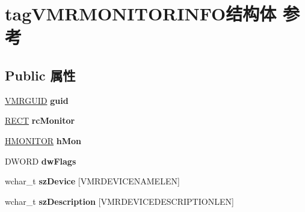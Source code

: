 \hypertarget{structtag_v_m_r_m_o_n_i_t_o_r_i_n_f_o}{}\section{tag\+V\+M\+R\+M\+O\+N\+I\+T\+O\+R\+I\+N\+F\+O结构体 参考}
\label{structtag_v_m_r_m_o_n_i_t_o_r_i_n_f_o}
\subsection*{Public 属性}
\begin{DoxyCompactItemize}
\item 
\mbox{\label{structtag_v_m_r_m_o_n_i_t_o_r_i_n_f_o_a5a3d93076c6969efb35dd047f0caa55b}} 
\hyperlink{structtag_v_m_r_g_u_i_d}{V\+M\+R\+G\+U\+ID} {\bfseries guid}
\item 
\mbox{\label{structtag_v_m_r_m_o_n_i_t_o_r_i_n_f_o_a97d40d63b150299f76507b3288fbbc51}} 
\hyperlink{structtag_r_e_c_t}{R\+E\+CT} {\bfseries rc\+Monitor}
\item 
\mbox{\label{structtag_v_m_r_m_o_n_i_t_o_r_i_n_f_o_aabe2951b924a80f1279dccd910df0f47}} 
\hyperlink{interfacevoid}{H\+M\+O\+N\+I\+T\+OR} {\bfseries h\+Mon}
\item 
\mbox{\label{structtag_v_m_r_m_o_n_i_t_o_r_i_n_f_o_a5336dcade6c6f9d66a127bed2a6140d7}} 
D\+W\+O\+RD {\bfseries dw\+Flags}
\item 
\mbox{\label{structtag_v_m_r_m_o_n_i_t_o_r_i_n_f_o_ae5c215e24ea7c325a4a8a8ac96dd25ea}} 
wchar\+\_\+t {\bfseries sz\+Device} \mbox{[}V\+M\+R\+D\+E\+V\+I\+C\+E\+N\+A\+M\+E\+L\+EN\mbox{]}
\item 
\mbox{\label{structtag_v_m_r_m_o_n_i_t_o_r_i_n_f_o_ab7e76eda1c55429c3d23b87894044f2c}} 
wchar\+\_\+t {\bfseries sz\+Description} \mbox{[}V\+M\+R\+D\+E\+V\+I\+C\+E\+D\+E\+S\+C\+R\+I\+P\+T\+I\+O\+N\+L\+EN\mbox{]}
\item 
\mbox{\label{structtag_v_m_r_m_o_n_i_t_o_r_i_n_f_o_a91856a91c215f3ea6f462f0bb623ffb1}} 

\end{DoxyCompactItemize}
